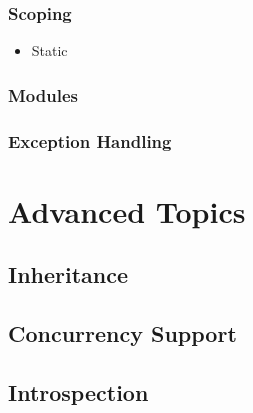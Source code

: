 \documentclass[titlepage,12pt]{article}
\newcommand{\bi}{\begin{itemize}}
\newcommand{\ei}{\end{itemize}}
\begin{document}
\subsubsection{Scoping}
\bi
    \item Static
\ei

\subsubsection{Modules}

\subsubsection{Exception Handling}


\section{Advanced Topics}

\subsection{Inheritance}
\subsection{Concurrency Support}
\subsection{Introspection}



\end{document}
